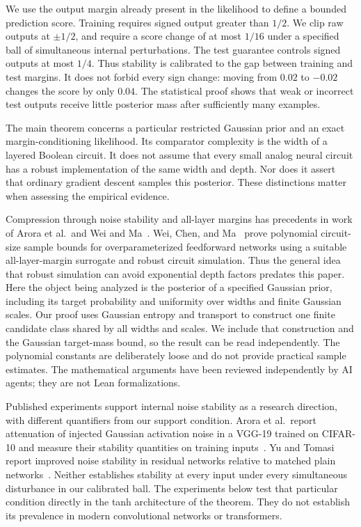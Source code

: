 \documentclass[11pt]{article}
\begin{document}
We use the output margin already present in the likelihood to define a
bounded prediction score. Training requires signed output greater than
$1/2$. We clip raw outputs at $\pm1/2$, and require a score change of at
most $1/16$ under a specified ball of simultaneous internal perturbations.
The test guarantee controls signed outputs at most $1/4$. Thus stability
is calibrated to the gap between training and test margins. It does not
forbid every sign change: moving from $0.02$ to $-0.02$ changes the score
by only $0.04$. The statistical proof shows that weak or incorrect test
outputs receive little posterior mass after sufficiently many examples.

The main theorem concerns a particular restricted Gaussian prior and an
exact margin-conditioning likelihood. Its comparator complexity is the
width of a layered Boolean circuit. It does not assume that every small
analog neural circuit has a robust implementation of the same width and
depth. Nor does it assert that ordinary gradient descent samples this
posterior. These distinctions matter when assessing the empirical evidence.

Compression through noise stability and all-layer margins has precedents
in work of Arora et al.\ and Wei and Ma~\cite{arora,weima}.
Wei, Chen, and Ma~\cite{weichenma} prove polynomial circuit-size sample
bounds for overparameterized feedforward networks using a suitable
all-layer-margin surrogate and robust circuit simulation. Thus the general
idea that robust simulation can avoid exponential depth factors predates
this paper. Here the object being analyzed is the posterior of a specified
Gaussian prior, including its target probability and uniformity over widths
and finite Gaussian scales.
Our proof uses Gaussian entropy and transport to construct one finite
candidate class shared by all widths and scales. We include that construction
and the Gaussian target-mass bound, so the result can be read independently.
The polynomial constants are deliberately loose and do not provide practical
sample estimates. The mathematical arguments have been reviewed independently
by AI agents; they are not Lean formalizations.

Published experiments support internal noise stability as a research
direction, with different quantifiers from our support condition.
Arora et al.\ report attenuation of injected Gaussian activation noise
in a VGG-19 trained on CIFAR-10 and measure their stability quantities
on training inputs~\cite{arora}. Yu and Tomasi report improved noise
stability in residual networks relative to matched plain
networks~\cite{yutomasi}. Neither establishes stability at every input
under every simultaneous disturbance in our calibrated ball. The
experiments below test that particular condition directly in the tanh
architecture of the theorem. They do not establish its prevalence in
modern convolutional networks or transformers.
\end{document}
